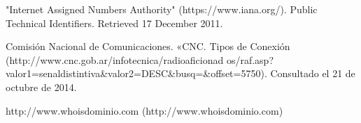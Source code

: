 \documentclass[a4paper,12pt]{article}
\begin{document}
\begin{thebibliography}{12}
"Internet Assigned Numbers Authority" (https://www.iana.org/). Public Technical Identifiers. Retrieved 17 December 2011.

Comisión Nacional de Comunicaciones. «CNC. Tipos de Conexión (http://www.cnc.gob.ar/infotecnica/radioaficionad os/raf.asp?valor1=senaldistintiva\&valor2=DESC\&busq=\&offset=5750). Consultado el 21 de octubre de 2014.

 http://www.whoisdominio.com (http://www.whoisdominio.com)
 
\end{thebibliography}
\end{document}
